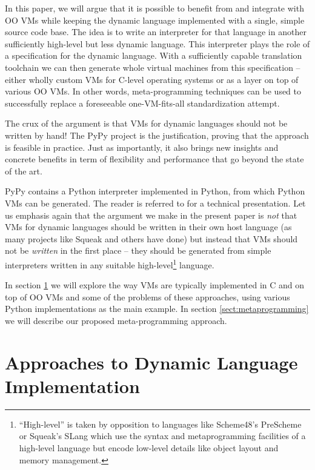 \documentclass{llncs}
\begin{document}
In this paper, we will argue that it is possible to
benefit from and integrate with OO VMs while keeping the dynamic
language implemented with a single, simple source code base.  The idea is
to write an interpreter for that language in another sufficiently
high-level but less dynamic language.  This interpreter plays the role
of a specification for the dynamic language.  With a sufficiently capable
translation toolchain we can then generate whole virtual machines from
this specification -- either wholly custom VMs for C-level operating
systems or as a layer on top of various OO VMs.  In other words,
meta-programming techniques can be used to successfully replace a
foreseeable one-VM-fits-all standardization attempt.

The crux of the argument is that VMs for dynamic languages should not be
written by hand!  The PyPy project \cite{pypy} is the justification,
proving that the approach is
feasible in practice.  Just as importantly, it also brings new insights
and concrete benefits in term of flexibility and performance that go
beyond the state of the art.

PyPy contains a Python interpreter implemented in Python, from which
Python VMs can be generated.  The reader is referred to
\cite{pypyvmconstruction} for a technical presentation.  Let us emphasis
again that the argument we make in the present paper is \emph{not} that
VMs for dynamic languages should be written in their own host language
(as many projects like Squeak \cite{Squeak} and others have done) but
instead that VMs should not be \emph{written} in the first place -- they
should be generated from simple interpreters written in any suitable
high-level\footnote{``High-level'' is taken by opposition to languages
like Scheme48's PreScheme \cite{kelsey-prescheme} or Squeak's \cite{Squeak}
SLang which use the syntax and
metaprogramming facilities of a high-level language but encode
low-level details like object layout and memory management.} language.

In section \ref{sect:approaches} we will explore the way VMs are typically
implemented in C and on top of OO VMs and some of the problems of these
approaches, using various Python implementations as the main example. In
section \ref{sect:metaprogramming} we will describe our proposed
meta-programming approach.


\section{Approaches to Dynamic Language Implementation}
\label{sect:approaches}
\end{document}
